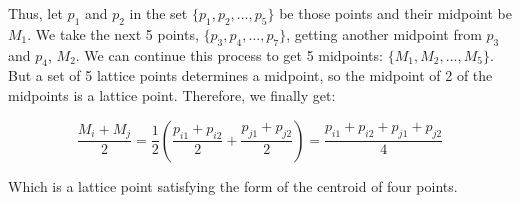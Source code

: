 \documentclass[]{article}
\begin{document}
Thus, let $p_1$ and $p_2$ in the set $\{p_1, p_2, \ldots, p_5\}$ be those points and their midpoint be $M_1$. We take the next 5 points, $\{p_3, p_4, \ldots, p_7\}$, getting another midpoint from $p_3$ and $p_4$, $M_2$. We can continue this process to get 5 midpoints: $\{M_1, M_2, \ldots, M_5\}$. But a set of 5 lattice points determines a midpoint, so the midpoint of 2 of the midpoints is a lattice point. Therefore, we finally get:

$$\frac{M_i + M_j}{2} = \frac{1}{2} \left(\frac{p_{i1} + p_{i2}}{2} + \frac{p_{j1} + p_{j2}}{2}\right) = \frac{p_{i1} + p_{i2} + p_{j1} + p_{j2}}{4}$$

Which is a lattice point satisfying the form of the centroid of four points. 
\end{document}
